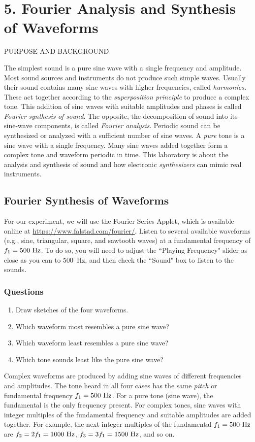 \documentclass[11pt]{NSF}
\def\ben{\begin{enumerate}}
\def\een{\end{enumerate}}
\def\i{\item{}}
\begin{document}
     
\section{5. Fourier Analysis and Synthesis of Waveforms}

PURPOSE AND BACKGROUND

The simplest sound is a pure sine wave with a single frequency and amplitude.
Most sound sources and instruments do not produce such simple waves. Usually
their sound contains many sine waves with higher frequencies, called {\em harmonics.}
These act together according to the {\em superposition principle} to produce a
complex tone. This addition of sine waves with suitable amplitudes and phases
is called {\em Fourier synthesis of sound}. 
The opposite, the decomposition of sound
into its sine-wave components, is called {\em Fourier analysis}. 
Periodic sound can
be synthesized or analyzed with a sufficient number of sine waves. 
A {\em pure} tone is a sine wave with a single frequency. 
Many sine waves added together form a
complex tone and waveform periodic in time. This laboratory is about the
analysis and synthesis of sound and how electronic 
{\em synthesizers} can mimic real instruments.

\subsection{Fourier Synthesis of Waveforms}

For our experiment, we will use the 
Fourier Series Applet, which is available online at 
\url{https://www.falstad.com/fourier/}.
Listen to several available waveforms (e.g.,  sine, triangular, 
square, and sawtooth waves) at a fundamental frequency of 
$f_1 = 500~{\rm Hz}$.
To do so, you will need to adjust the ``Playing Frequency" 
slider as close as you can to 500~Hz,  
and then check the ``Sound" box to listen to the sounds.

\subsubsection*{Questions}
\ben
\i Draw sketches of the four waveforms.

\i Which waveform most resembles a pure sine wave?

\i Which waveform least resembles a pure sine wave?

\i Which tone sounds least like the pure sine wave?
\een

Complex waveforms are produced by adding sine waves of different frequencies
and amplitudes. The tone heard in all four cases has the same {\em pitch} or
fundamental frequency $f_1= 500~{\rm Hz}$. For a pure tone (sine wave), the fundamental
is the only frequency present. For complex tones, sine waves with integer
multiples of the fundamental frequency and suitable amplitudes are added
together. For example, the next integer multiples of the fundamental 
$f_1 = 500~{\rm Hz}$ are 
$f_2 = 2 f_1= 1000~{\rm Hz}$, 
$f_3 = 3 f_1 = 1500~{\rm Hz}$, and so on.
\end{document}
